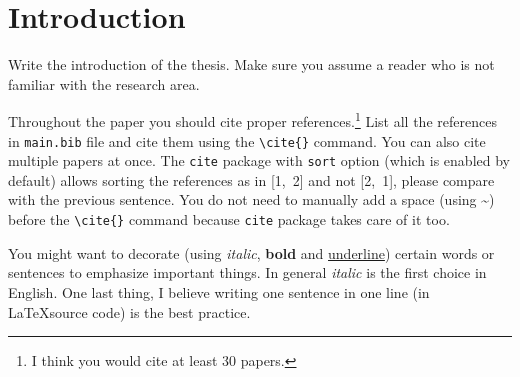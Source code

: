 \chapter{Introduction}\label{ch:introduction}

Write the introduction of the thesis.
Make sure you assume a reader who is not familiar with the research area.

Throughout the paper you should cite proper references\cite{bar:great2020coolname}.\footnote{I think you would cite at least 30 papers.}
List all the references in \texttt{main.bib} file and cite them using the \texttt{{\textbackslash}cite\{\}} command.
You can also cite multiple papers at once\cite{garply:happy2021anothercoolname,bar:great2020coolname}.
The \texttt{cite} package with \texttt{sort} option (which is enabled by default) allows sorting the references as in [1,~2] and not [2,~1], please compare with the previous sentence\cite{bar:great2020coolname,garply:happy2021anothercoolname}.
You do not need to manually add a space (using {\textasciitilde}) before the \texttt{{\textbackslash}cite\{\}} command because \texttt{cite} package takes care of it too.

You might want to decorate (using \textit{italic}, \textbf{bold} and \underline{underline}) certain words or sentences to emphasize important things.
In general \textit{italic} is the first choice in English.
One last thing, I believe writing one sentence in one line (in \LaTeX source code) is the best practice.